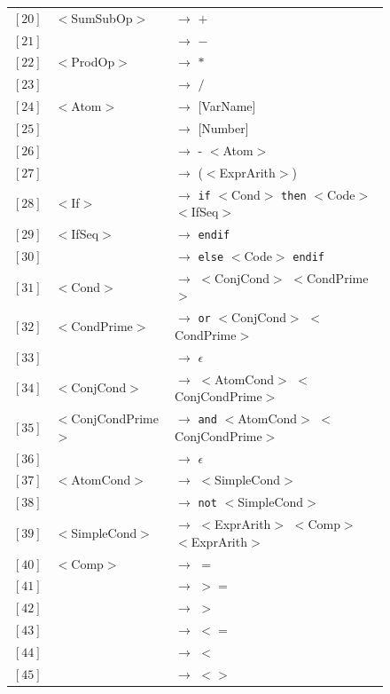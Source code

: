 \documentclass[letterpaper]{article}
\begin{document}
{\begin{figure}[H]
\begin{tabular}{r l l}
        $[20]$ & $<$SumSubOp$>$ & $\rightarrow$ $+$ \\
        $[21]$ & & $\rightarrow$ $-$ \\
        $[22]$ & $<$ProdOp$>$ & $\rightarrow$ $*$ \\
        $[23]$ & & $\rightarrow$ $/$ \\
        $[24]$ & $<$Atom$>$ & $\rightarrow$ [VarName] \\
        $[25]$ & & $\rightarrow$ [Number] \\
        $[26]$ & & $\rightarrow$ - $<$Atom$>$ \\
        $[27]$ & & $\rightarrow$ ($<$ExprArith$>$) \\

        $[28]$ & $<$If$>$ & $\rightarrow$
        \texttt{if} $<$Cond$>$ \texttt{then} $<$Code$>$ $<$IfSeq$>$ \\
        $[29]$ & $<$IfSeq$>$ & $\rightarrow$
        \texttt{endif} \\
        $[30]$ & & $\rightarrow$
        \texttt{else} $<$Code$>$ \texttt{endif} \\

        $[31]$ & $<$Cond$>$ & $\rightarrow$
        $<$ConjCond$>$ $<$CondPrime$>$ \\
        $[32]$ & $<$CondPrime$>$ & $\rightarrow$
        \texttt{or} $<$ConjCond$>$ $<$CondPrime$>$ \\
        $[33]$ & & $\rightarrow$ $\epsilon$ \\
        $[34]$ & $<$ConjCond$>$ & $\rightarrow$
        $<$AtomCond$>$ $<$ConjCondPrime$>$ \\
        $[35]$ & $<$ConjCondPrime$>$ & $\rightarrow$
        \texttt{and} $<$AtomCond$>$ $<$ConjCondPrime$>$ \\
        $[36]$ & & $\rightarrow$ $\epsilon$ \\
        $[37]$ & $<$AtomCond$>$ & $\rightarrow$ $<$SimpleCond$>$ \\
        $[38]$ & & $\rightarrow$ \texttt{not} $<$SimpleCond$>$ \\

        $[39]$ & $<$SimpleCond$>$ & $\rightarrow$
        $<$ExprArith$>$ $<$Comp$>$ $<$ExprArith$>$ \\
        $[40]$ & $<$Comp$>$ & $\rightarrow$ $=$ \\
        $[41]$ & & $\rightarrow$ $>=$ \\
        $[42]$ & & $\rightarrow$ $>$ \\
        $[43]$ & & $\rightarrow$ $<=$ \\
        $[44]$ & & $\rightarrow$ $<$ \\
        $[45]$ & & $\rightarrow$ $<>$ \\


\end{tabular}
\end{figure}}
\end{document}

